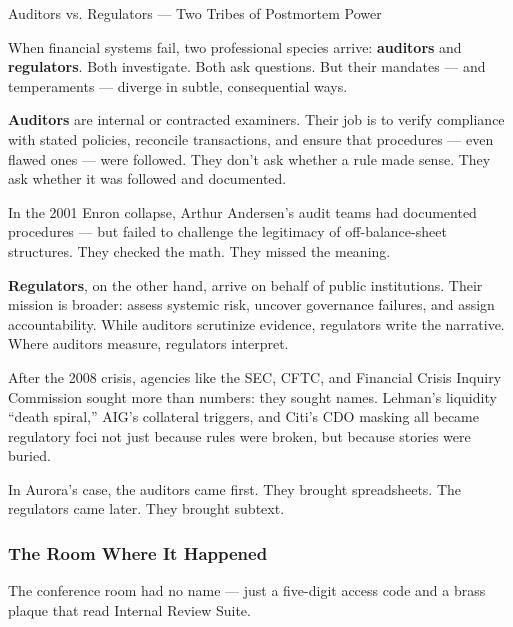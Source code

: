 \begin{HistoricalSidebar}{Auditors vs. Regulators — Two Tribes of Postmortem Power}

  When financial systems fail, two professional species arrive: \textbf{auditors} and \textbf{regulators}. 
  Both investigate. Both ask questions. But their mandates — and temperaments — diverge in subtle, consequential ways.

  \medskip
  
  \textbf{Auditors} are internal or contracted examiners. Their job is to verify compliance with stated policies, 
  reconcile transactions, and ensure that procedures — even flawed ones — were followed. They don’t ask whether a 
  rule made sense. They ask whether it was followed and documented.

  \medskip
  
  In the 2001 Enron collapse, Arthur Andersen’s audit teams had documented procedures — but failed to challenge 
  the legitimacy of off-balance-sheet structures. They checked the math. They missed the meaning.

  \medskip
  
  \textbf{Regulators}, on the other hand, arrive on behalf of public institutions. Their mission is broader: 
  assess systemic risk, uncover governance failures, and assign accountability. While auditors scrutinize evidence, 
  regulators write the narrative. Where auditors measure, regulators interpret.

  \medskip
  
  After the 2008 crisis, agencies like the SEC, CFTC, and Financial Crisis Inquiry Commission sought more than numbers: 
  they sought names. Lehman’s liquidity “death spiral,” AIG’s collateral triggers, and Citi’s CDO masking all became 
  regulatory foci not just because rules were broken, but because stories were buried.

  \medskip
  
  In Aurora’s case, the auditors came first. They brought spreadsheets.  
  The regulators came later. They brought subtext.
  
\end{HistoricalSidebar}

\medskip

\subsubsection{The Room Where It Happened}

The conference room had no name — just a five-digit access code and a brass plaque that read Internal Review Suite.

